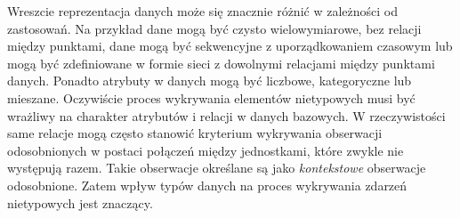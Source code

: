 \documentclass[12pt,a4paper,oneside]{book}
\theoremstyle{definition}
\begin{document}
Wreszcie reprezentacja danych może się znacznie różnić w zależności od zastosowań. Na przykład dane mogą być czysto wielowymiarowe, bez relacji między punktami, dane mogą być sekwencyjne z uporządkowaniem czasowym lub mogą być zdefiniowane w formie sieci z dowolnymi relacjami między punktami danych. Ponadto atrybuty w danych mogą być liczbowe, kategoryczne lub mieszane. Oczywiście proces wykrywania elementów nietypowych musi być wrażliwy na charakter atrybutów i relacji w danych bazowych. W rzeczywistości same relacje mogą często stanowić kryterium wykrywania obserwacji odosobnionych w postaci połączeń między jednostkami, które zwykle nie występują razem. Takie obserwacje określane są jako \textit{kontekstowe} obserwacje odosobnione. Zatem wpływ typów danych na proces wykrywania zdarzeń nietypowych jest znaczący.
\end{document}
